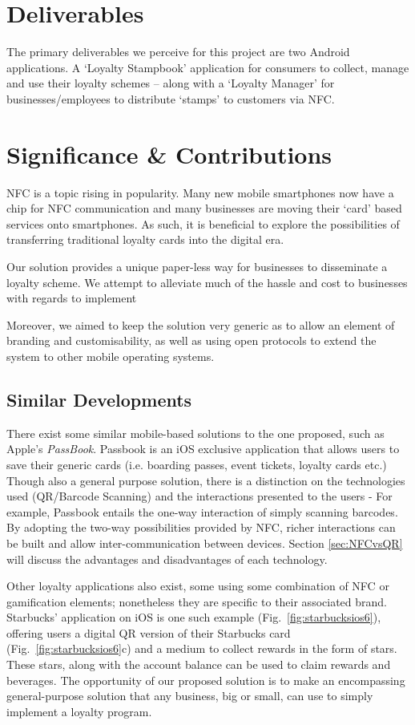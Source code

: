\section{Deliverables}
The primary deliverables we perceive for this project are two Android applications. A `Loyalty Stampbook' application for consumers to collect, manage and use their loyalty schemes -- along with a `Loyalty Manager' for businesses/employees to distribute `stamps' to customers via NFC.  

\section{Significance \& Contributions}
NFC is a topic rising in popularity. Many new mobile smartphones now have a chip for NFC communication and many businesses are moving their `card' based services onto smartphones. As such, it is beneficial to explore the possibilities of transferring traditional loyalty cards into the digital era. 

Our solution provides a unique paper-less way for businesses to disseminate a loyalty scheme. We attempt to alleviate much of the hassle and cost to businesses with regards to implement

Moreover, we aimed to keep the solution very generic as to allow an element of branding and customisability, as well as using open protocols to extend the system to other mobile operating systems.   

\subsection{Similar Developments}
There exist some similar mobile-based solutions to the one proposed, such as Apple's \emph{PassBook}. Passbook is an iOS exclusive application that allows users to save their generic cards (i.e. boarding passes, event tickets, loyalty cards etc.) Though also a general purpose solution, there is a distinction on the technologies used (QR/Barcode Scanning) and the interactions presented to the users - For example, Passbook entails the one-way interaction of simply scanning barcodes. By adopting the two-way possibilities provided by NFC, richer interactions can be built and allow inter-communication between devices. Section \ref{sec:NFCvsQR} will discuss the advantages and disadvantages of each technology.

Other loyalty applications also exist, some using some combination of NFC or gamification elements; nonetheless they are specific to their associated brand. Starbucks' application on iOS is one such example (Fig.~\ref{fig:starbucksios6}), offering users a digital QR version of their Starbucks card (Fig.~\ref{fig:starbucksios6}c) and a medium to collect rewards in the form of stars. These stars, along with the account balance can be used to claim rewards and beverages. The opportunity of our proposed solution is to make an encompassing general-purpose solution that any business, big or small, can use to simply implement a loyalty program.

